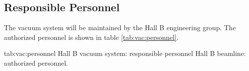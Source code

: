 \begin{safetyen}{10}{15}
\subsection{Responsible  Personnel} 
\end{safetyen}
The vacuum system will be maintained by the Hall B engineering group. The authorized personnel is shown in table \ref{tab:vac:personnel}.
\begin{namestab}{tab:vac:personnel}{ Hall B vacuum system: responsible personnel}{%
       Hall B beamline: authorized personnel.}
\end{namestab}


